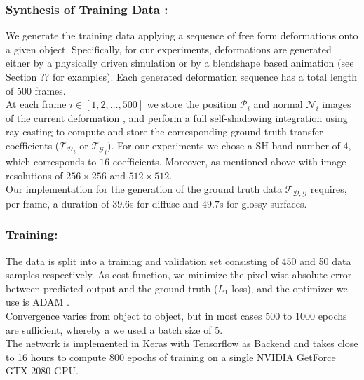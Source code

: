 \subsubsection*{Synthesis of Training Data :\\}
We generate the training data applying a sequence of free form deformations onto a given object. Specifically, for our experiments, deformations are generated either by a physically driven simulation or by a blendshape based animation (see Section ?? for examples). Each generated deformation sequence has a total length of 500 frames. 
\\
At each frame $i \in [1,2,\dots,500]$ we store the position $\mathcal{P}_i$  and normal $\mathcal{N}_i$ images of the current deformation , and perform a full self-shadowing integration using ray-casting to compute and store the corresponding ground truth transfer coefficients ($\mathcal{T_D}_i$ or $\mathcal{T_G}_i$). For our experiments we chose a SH-band number of $4$, which corresponds to $16$ coefficients. Moreover, as mentioned above with image resolutions of $256 \times 256$ and $512 \times 512$. 
\\
Our implementation for the generation of the ground truth data $\mathcal{T_{D,G}}$ requires, per frame, a duration of $39.6$s for diffuse and $49.7$s for glossy surfaces.

\subsubsection*{Training: \\} 
The data is split into a training and validation set consisting of 450 and 50 data samples respectively. As cost function, we minimize the pixel-wise absolute error between predicted output and the ground-truth ($L_1$-loss), and the optimizer we use is ADAM \cite{ADAM}. 
\\
Convergence varies from object to object, but in most cases 500 to 1000 epochs are sufficient, whereby a we used a batch size of 5. \\
The network is implemented in Keras with Tensorflow as Backend \cite{Keras} and takes close to 16 hours to compute 800 epochs of training on a single NVIDIA GetForce GTX 2080 GPU.

